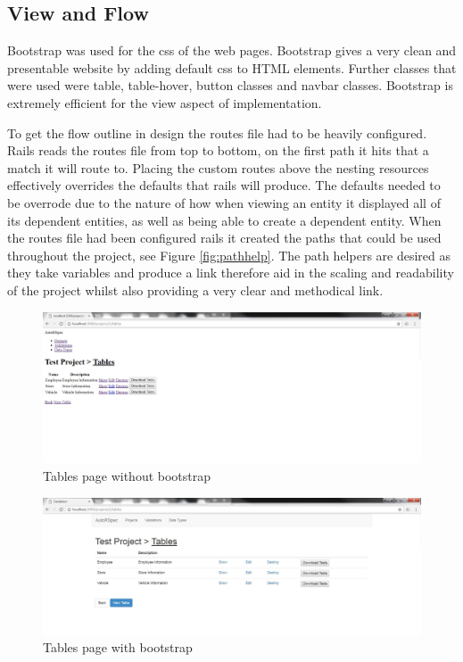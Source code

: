\documentclass[a4paper,12pt]{article}
\begin{document}
\subsection{View and Flow}
\par Bootstrap\cite{bootstrap} was used for the css of the web pages. Bootstrap gives a very clean and presentable website by adding default css to HTML elements. Further classes that were used were table, table-hover, button classes and navbar classes. Bootstrap is extremely efficient for the view aspect of implementation. 
\vspace{3mm}
\par To get the flow outline in design the routes file had to be heavily configured. Rails reads the routes file from top to bottom, on the first path it hits that a match it will route to. Placing the custom routes above the nesting resources effectively overrides the defaults that rails will produce. The defaults needed to be overrode due to the nature of how when viewing an entity it displayed all of its dependent entities, as well as being able to create a dependent entity. When the routes file had been configured rails it created the paths that could be used throughout the project, see Figure \ref{fig:pathhelp}. The path helpers are desired as they take variables and produce a link therefore aid in the scaling and readability of the project whilst also providing a very clear and methodical link\cite{routing}.



\begin{figure}
\includegraphics[width=\linewidth]{screenshots/nobootstrap}
\caption{Tables page without bootstrap}
\label{fig:nobootstrap}
\end{figure}

\begin{figure}
\includegraphics[width=\linewidth]{screenshots/bootstrap}
\caption{Tables page with bootstrap}
\label{fig:bootstrap}
\end{figure}
\end{document}
